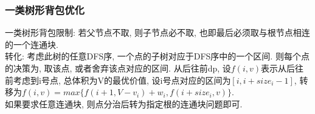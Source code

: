 \subsubsection{一类树形背包优化}
\noindent
一类树形背包限制: 若父节点不取, 则子节点必不取, 也即最后必须取与根节点相连的一个连通块.\\
转化: 考虑此树的任意DFS序, 一个点的子树对应于DFS序中的一个区间. 则每个点的决策为, 取该点, 或者舍弃该点对应的区间. 从后往前dp, 设$f(i, v)$表示从后往前考虑到i号点, 总体积为V的最优价值, 设i号点对应的区间为$[i,i+size_i-1]$, 转移为$f(i, v)=max\{f(i+1, V-v_i)+w_i, f(i+size_i, v)\}$.\\
如果要求任意连通块, 则点分治后转为指定根的连通块问题即可.
